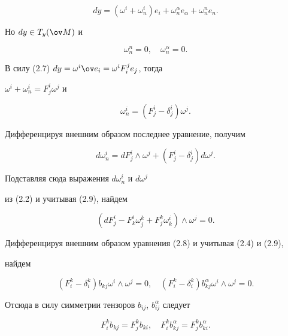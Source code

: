 $$ 


dy=(\omega^i+\omega^i_n)e_i+\omega^\alpha_n e_\alpha+ 


\omega^n_n e_n. 


$$ 


Но $dy\in T_y(\ov M)$ и 


\addtocounter{equation}{2}


\begin{equation} 


\omega^n_n=0,\quad \omega^\alpha_n=0. 


\end{equation} 


В силу (2.7)\; $dy=\omega^i\ov e_i=\omega^i F^j_i e_j$, тогда 


$\omega^i+\omega^i_n=F^i_j\omega^j$ и 


\begin{equation} 


\omega^i_n=(F^i_j-\delta^i_j)\omega^j. 


\end{equation} 


Дифференцируя внешним образом последнее уравнение, получим 


$$ 


d\omega^i_n=d F^i_j\wedge\omega^j+(F^i_j-\delta^i_j)d\omega^j. 


$$ 


Подставляя сюда выражения $d\omega^i_n$ и $d\omega^j$ 


из (2.2) и учитывая (2.9), найдем 


\begin{equation} 


(d F^i_j-F^i_k\omega^k_j+F^k_j\omega^i_k)\wedge\omega^j=0. 


\end{equation} 


Дифференцируя внешним образом уравнения (2.8) и учитывая (2.4) и (2.9), 


найдем 


$$ 


(F^k_i-\delta^k_i)b_{kj}\omega^i\wedge\omega^j=0,\quad 


(F^k_i-\delta^k_i)b^\alpha_{kj}\omega^i\wedge\omega^j=0. 


$$ 


Отсюда в силу симметрии тензоров $b_{ij}$, $b^\alpha_{ij}$ следует 


\begin{equation} 


F^k_i b_{kj}=F^k_j b_{ki},\quad 


F^k_i b^\alpha_{kj}=F^k_j b^\alpha_{ki}. 


\end{equation} 


